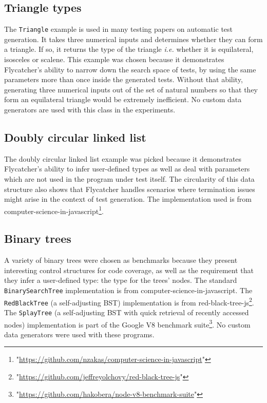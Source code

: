 \subsection{Triangle types}
The \texttt{Triangle} example is used in many testing papers on automatic test generation. It takes three numerical inputs and determines whether they can form a triangle. If so, it returns the type of the triangle \emph{i.e.} whether it is equilateral, isosceles or scalene. This example was chosen because it demonstrates \textsf{Flycatcher}'s ability to narrow down the search space of tests, by using the same parameters more than once inside the generated tests. Without that ability, generating three numerical inputs out of the set of natural numbers so that they form an equilateral triangle would be extremely inefficient. No custom data generators are used with this class in the experiments.

\subsection{Doubly circular linked list}
The doubly circular linked list example was picked because it demonstrates \textsf{Flycatcher}'s ability to infer user-defined types as well as deal with parameters which are not used in the program under test itself. The circularity of this data structure also shows that \textsf{Flycatcher} handles scenarios where termination issues might arise in the context of test generation. The implementation used is from \textsf{computer-science-in-javascript}\footnote{"\url{https://github.com/nzakas/computer-science-in-javascript}"}.

\subsection{Binary trees}
A variety of binary trees were chosen as benchmarks because they present interesting control structures for code coverage, as well as the requirement that they infer a user-defined type: the type for the trees' nodes. The standard \texttt{BinarySearchTree} implementation is from \textsf{computer-science-in-javascript}\footnotemark[2]. The \texttt{RedBlackTree} (a self-adjusting BST) implementation is from \textsf{red-black-tree-js}\footnote{"\url{https://github.com/jeffreyolchovy/red-black-tree-js}"}. The \texttt{SplayTree} (a self-adjusting BST with quick retrieval of recently accessed nodes) implementation is part of the Google V8 benchmark suite\footnote{"\url{https://github.com/hakobera/node-v8-benchmark-suite}"}. No custom data generators were used with these programs.

